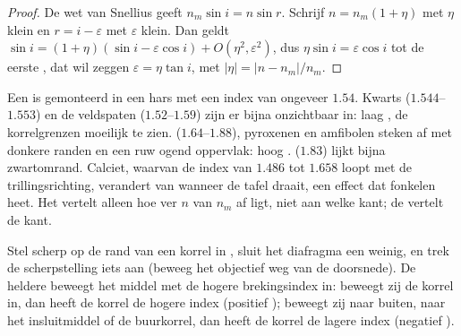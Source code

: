 \begin{proof}
De wet van Snellius geeft $n_m \sin i = n \sin r$. Schrijf $n = n_m(1 + \eta)$ met $\eta$ klein en $r = i - \varepsilon$ met $\varepsilon$ klein. Dan
geldt $\sin i = (1 + \eta)(\sin i - \varepsilon\cos i) + O(\eta^2, \varepsilon^2)$, dus $\eta \sin i = \varepsilon\cos i$ tot de eerste , dat wil
zeggen $\varepsilon = \eta\tan i$, met $|\eta| = |n - n_m|/n_m$.
\end{proof}

Een  is gemonteerd in een hars met een index van ongeveer $1.54$.
Kwarts ($1.544$--$1.553$) en de veldspaten ($1.52$--$1.59$) zijn er bijna onzichtbaar in: laag , de korrelgrenzen moeilijk te zien.
 ($1.64$--$1.88$), pyroxenen en amfibolen steken af met donkere randen en een ruw ogend oppervlak: hoog .  ($1.83$) lijkt bijna
zwartomrand. Calciet, waarvan de index van $1.486$ tot $1.658$ loopt met de trillingsrichting, verandert van  wanneer de tafel draait, een effect dat
fonkelen heet.
Het  vertelt alleen hoe ver $n$ van $n_m$ af ligt, niet aan welke kant; de  vertelt de kant.

\begin{method}\label{met:b1:optical-mineralogy:becke}
Stel scherp op de rand van een korrel in , sluit het diafragma een weinig, en trek de scherpstelling iets aan (beweeg het objectief
weg van de doorsnede). De heldere  beweegt het middel met de hogere brekingsindex in: beweegt zij de korrel in, dan heeft de korrel de hogere
index (positief ); beweegt zij naar buiten, naar het insluitmiddel of de buurkorrel, dan heeft de korrel de lagere index (negatief ).
\end{method}

